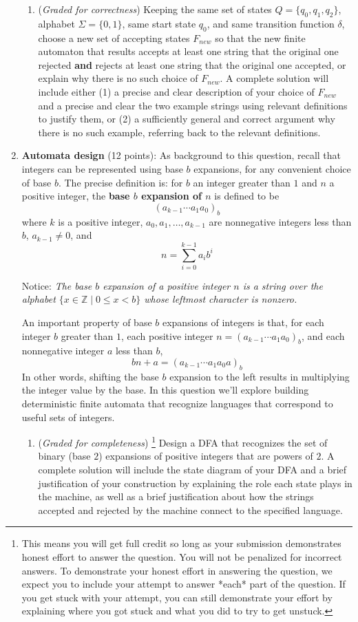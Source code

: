 \documentclass[12pt, oneside]{article}
\newcommand{\gradeCorrect}{({\it Graded for correctness}) }
\newcommand{\gradeComplete}{({\it Graded for completeness}) }
\newcommand{\gradeCompleteFirst}{\gradeComplete\footnote{This means you will 
get full credit so long as your submission demonstrates honest effort to 
answer the question. You will not be penalized for incorrect answers. 
To demonstrate your honest effort in answering the question, we 
expect you to include your attempt to answer *each* part of the question. 
If you get stuck with your attempt, you can still demonstrate 
your effort by explaining where you got stuck and what 
you did to try to get unstuck.} }
\newcommand{\st}{\mid}
\begin{document}
\begin{enumerate}[wide, labelwidth=!, labelindent=0pt]
\begin{enumerate}
    \item\gradeCorrect Keeping the same set of states $Q = \{q_0, q_1, q_2\}$, alphabet $\Sigma = \{0,1\}$, 
    same start state $q_0$, and same transition 
    function $\delta$, choose a new set of accepting states $F_{new}$ so that the new 
    finite automaton that results accepts at least one string that the original one rejected {\bf and} rejects
    at least one string that the original one accepted, or explain why there is no such choice of $F_{new}$.
    A complete solution will include either (1) a precise and
    clear description of your choice of $F_{new}$
    and a precise and clear the two example strings using relevant definitions 
    to justify them, or (2) a sufficiently general and correct argument
    why there is no such example, referring back to the relevant definitions.

    \end{enumerate}
\item \textbf{Automata design} (12 points):
As background to this question, recall that integers can be represented using base $b$ expansions, for 
any convenient choice of base $b$. The precise definition is:
for $b$ an integer greater than $1$ and $n$ a positive integer, 
the {\bf base $b$ expansion of $n$}  is defined to be
\[
(a_{k-1} \cdots a_1 a_0)_b
\]
where $k$ is a positive integer, $a_0, a_1, \ldots, a_{k-1}$ 
are nonnegative integers less than $b$, $a_{k-1} \neq  0$, and
\[
n =  \sum_{i=0}^{k-1} a_{i} b^{i}
\]

Notice: {\it The base $b$ expansion of a positive integer $n$ is a string over the alphabet 
$\{x \in \mathbb{Z} \st 0 \leq x < b\}$
whose leftmost character is nonzero.}

An important property of base $b$ expansions of integers is that, for each integer $b$ greater than $1$,
each positive integer $n = (a_{k-1} \cdots a_1 a_0)_b$, and each nonnegative integer $a$ less than $b$, 
\[
    bn + a = (a_{k-1} \cdots a_1 a_0a)_b
\]
In other words, shifting the base $b$ expansion to the left results in multiplying the integer value by the base.
In this question we'll explore building deterministic finite automata that recognize 
languages that correspond to useful sets of integers.

    \begin{enumerate}
    \item\gradeCompleteFirst Design a DFA that recognizes the set of binary (base $2$) expansions of 
    positive integers that are powers of $2$. A complete solution will include the state diagram of your DFA and 
    a brief justification 
    of your construction by explaining the role each state plays in the machine, as well as a brief 
    justification about how the strings accepted and rejected by the machine connect to the specified language.


\end{enumerate}
\end{enumerate}
\end{document}
